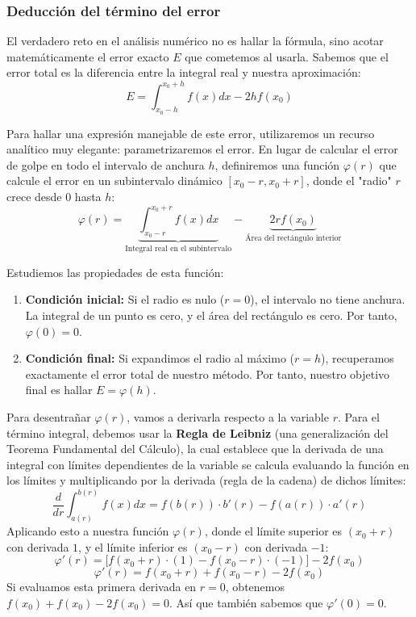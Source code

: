 \subsubsection{Deducción del término del error}

El verdadero reto en el análisis numérico no es hallar la fórmula, sino acotar matemáticamente el error exacto $E$ que cometemos al usarla. Sabemos que el error total es la diferencia entre la integral real y nuestra aproximación:
\[
    E = \int_{x_0-h}^{x_0+h} f(x) dx - 2h f(x_0)
\]

Para hallar una expresión manejable de este error, utilizaremos un recurso analítico muy elegante: parametrizaremos el error. En lugar de calcular el error de golpe en todo el intervalo de anchura $h$, definiremos una función $\varphi(r)$ que calcule el error en un subintervalo dinámico $[x_0 - r, x_0 + r]$, donde el "radio" $r$ crece desde $0$ hasta $h$:
\[
    \varphi(r) = \underbrace{\int_{x_0-r}^{x_0+r} f(x) dx}_{\text{Integral real en el subintervalo}} - \underbrace{2r f(x_0)}_{\text{Área del rectángulo interior}}
\]

Estudiemos las propiedades de esta función:
\begin{enumerate}
    \item \textbf{Condición inicial:} Si el radio es nulo ($r=0$), el intervalo no tiene anchura. La integral de un punto es cero, y el área del rectángulo es cero. Por tanto, $\varphi(0) = 0$.
    \item \textbf{Condición final:} Si expandimos el radio al máximo ($r=h$), recuperamos exactamente el error total de nuestro método. Por tanto, nuestro objetivo final es hallar $E = \varphi(h)$.
\end{enumerate}

Para desentrañar $\varphi(r)$, vamos a derivarla respecto a la variable $r$. Para el término integral, debemos usar la \textbf{Regla de Leibniz} (una generalización del Teorema Fundamental del Cálculo), la cual establece que la derivada de una integral con límites dependientes de la variable se calcula evaluando la función en los límites y multiplicando por la derivada (regla de la cadena) de dichos límites:
\[
    \frac{d}{dr} \int_{a(r)}^{b(r)} f(x) dx = f(b(r)) \cdot b'(r) - f(a(r)) \cdot a'(r)
\]
Aplicando esto a nuestra función $\varphi(r)$, donde el límite superior es $(x_0+r)$ con derivada $1$, y el límite inferior es $(x_0-r)$ con derivada $-1$:
\[
    \varphi'(r) = \Big[ f(x_0 + r) \cdot (1) - f(x_0 - r) \cdot (-1) \Big] - 2f(x_0)
\]
\[
    \varphi'(r) = f(x_0 + r) + f(x_0 - r) - 2f(x_0)
\]
Si evaluamos esta primera derivada en $r=0$, obtenemos $f(x_0) + f(x_0) - 2f(x_0) = 0$. Así que también sabemos que $\varphi'(0) = 0$.

